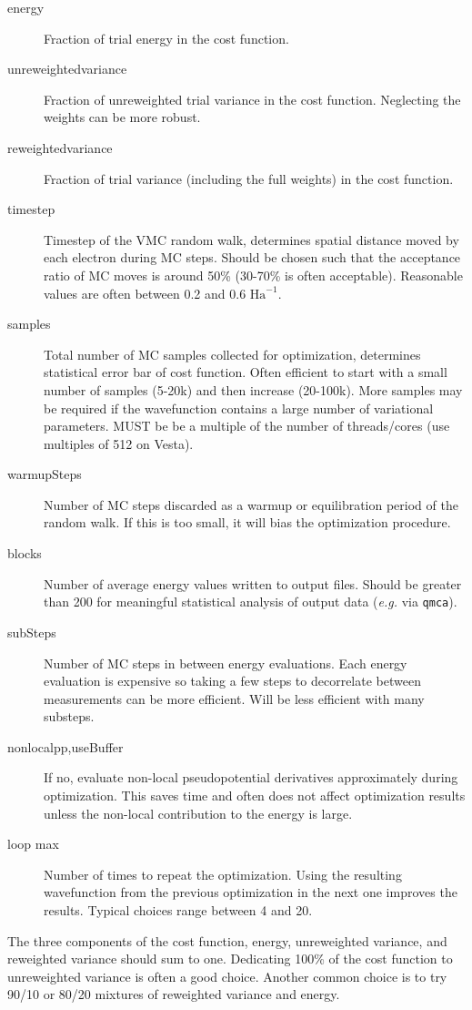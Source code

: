 \begin{description}
  \item[energy] Fraction of trial energy in the cost function.
  \item[unreweightedvariance] Fraction of unreweighted trial variance in the cost function.  Neglecting the weights can be more robust.
  \item[reweightedvariance] Fraction of trial variance (including the full weights) in the cost function.  
  \item[timestep] Timestep of the VMC random walk, determines spatial distance moved by each electron during MC steps.  Should be chosen such that the acceptance ratio of MC moves is around 50\% (30-70\% is often acceptable).  Reasonable values are often between 0.2 and 0.6 $\textrm{Ha}^{-1}$.
  \item[samples] Total number of MC samples collected for optimization, determines statistical error bar of cost function.  Often efficient to start with a small number of samples (5-20k) and then increase (20-100k).  More samples may be required if the wavefunction contains a large number of variational parameters.  MUST be be a multiple of the number of threads/cores (use multiples of 512 on Vesta).
  \item[warmupSteps]  Number of MC steps discarded as a warmup or equilibration period of the random walk.  If this is too small, it will bias the optimization procedure.
  \item[blocks]  Number of average energy values written to output files.  Should be greater than 200 for meaningful statistical analysis of output data (\emph{e.g.} via \texttt{qmca}).
  \item[subSteps] Number of MC steps in between energy evaluations.  Each energy evaluation is expensive so taking a few steps to decorrelate between measurements can be more efficient.  Will be less efficient with many substeps.
  \item[nonlocalpp,useBuffer] If no, evaluate non-local pseudopotential derivatives approximately during optimization.  This saves time and often does not affect optimization results unless the non-local contribution to the energy is large.
  \item[loop max] Number of times to repeat the optimization.  Using the resulting wavefunction from the previous optimization in the next one improves the results.  Typical choices range between 4 and 20.   
\end{description}
The three components of the cost function, energy, unreweighted variance, and reweighted variance should sum to one.  Dedicating 100\% of the cost function to unreweighted variance is often a good choice.  Another common choice is to try 90/10 or 80/20 mixtures of reweighted variance and energy.  

